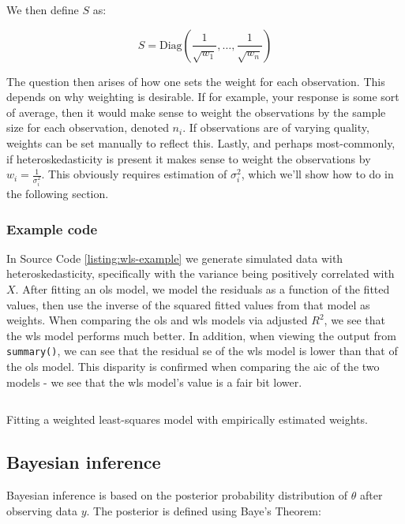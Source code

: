 \documentclass{report}
\begin{document}
We then define $S$ as:

\begin{equation}\label{eq:ols-wls-s-matrix}
    S = \text{Diag}\left(\frac{1}{\sqrt{w_1}}, \dots, \frac{1}{\sqrt{w_n}}\right)
\end{equation}

The question then arises of how one sets the weight for each observation. This depends on why weighting is desirable. If for example, your response is some sort of average, then it would make sense to weight the observations by the sample size for each observation, denoted $n_i$. If observations are of varying quality, weights can be set manually to reflect this. Lastly, and perhaps most-commonly, if heteroskedasticity is present it makes sense to weight the observations by $w_i = \frac{1}{\sigma^2_i}$. This obviously requires estimation of $\sigma^2_i$, which we'll show how to do in the following section. 

\subsubsection{Example code}

In Source Code \ref{listing:wls-example} we generate simulated data with heteroskedasticity, specifically with the variance being positively correlated with $X$. After fitting an \gls{ols} model, we model the residuals as a function of the fitted values, then use the inverse of the squared fitted values from that model as weights. When comparing the \gls{ols} and \gls{wls} models via adjusted $R^2$, we see that the \gls{wls} model performs much better. In addition, when viewing the output from \texttt{summary()}, we can see that the residual \gls{se} of the \gls{wls} model is lower than that of the \gls{ols} model. This disparity is confirmed when comparing the \gls{aic} of the two models - we see that the \gls{wls} model's value is a fair bit lower. 

\begin{listing}[h!]
\inputminted{r}{Example-Code/weighted_least_squares.R}
\caption{Fitting a weighted least-squares model with empirically estimated weights.}
\label{listing:wls-example}
\end{listing}

\subsection{Bayesian inference}\label{sec:bayes}

Bayesian inference is based on the posterior probability distribution of $\theta$ after observing data $y$. The posterior is defined using Baye's Theorem:
\end{document}
